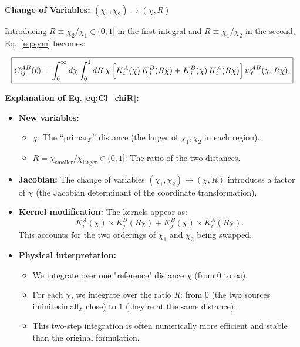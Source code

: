 \noindent\textbf{\large Change of Variables: $(\chi_1, \chi_2) \to (\chi, R)$}

Introducing $R \equiv \chi_2/\chi_1 \in (0,1]$ in the first integral and $R \equiv \chi_1/\chi_2$ in the second, Eq.~\eqref{eq:sym} becomes:

\begin{equation}
    \boxed{C^{AB}_{ij}(\ell) =
    \int_0^\infty d\chi
    \int_0^1 dR\;\chi\,
    \Bigl[K^A_i(\chi)\,K^B_j(R\chi) + K^B_j(\chi)\,K^A_i(R\chi)\Bigr]\,
    w^{AB}_\ell(\chi,R\chi),}
    \label{eq:Cl_chiR}
\end{equation}

\noindent\textbf{\large Explanation of Eq.\,\eqref{eq:Cl_chiR}:}\\

\begin{itemize}[leftmargin=1.5cm]
    \item \textbf{New variables:}
    \begin{itemize}
        \item $\chi$: The ``primary'' distance (the larger of $\chi_1, \chi_2$ in each region).
        \item $R = \chi_{\text{smaller}}/\chi_{\text{larger}} \in (0,1]$: The ratio of the two distances.
    \end{itemize}

    \item \textbf{Jacobian:} The change of variables $(\chi_1,\chi_2) \to (\chi, R)$ introduces a factor of $\chi$ (the Jacobian determinant of the coordinate transformation).

    \item \textbf{Kernel modification:} The kernels appear as:
    \begin{equation}
        K^A_i(\chi) \times K^B_j(R\chi) + K^B_j(\chi) \times K^A_i(R\chi).
    \end{equation}
    This accounts for the two orderings of $\chi_1$ and $\chi_2$ being swapped.

    \item \textbf{Physical interpretation:}
    \begin{itemize}
        \item We integrate over one "reference" distance $\chi$ (from $0$ to $\infty$).
        \item For each $\chi$, we integrate over the ratio $R$: from $0$ (the two sources infinitesimally close) to $1$ (they're at the same distance).
        \item This two-step integration is often numerically more efficient and stable than the original formulation.
    \end{itemize}


\end{itemize}
